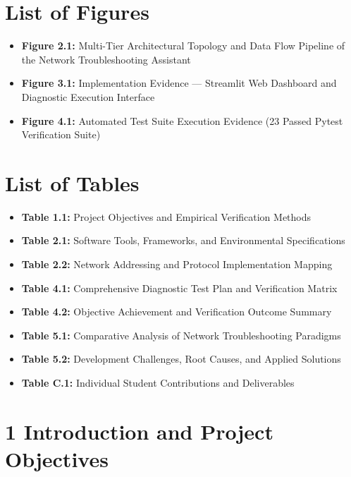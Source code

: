 \documentclass[
]{article}
\providecommand{\tightlist}{%
  \setlength{\itemsep}{0pt}\setlength{\parskip}{0pt}}
\begin{document}
\vspace{0.5cm}

\section{List of Figures}\label{list-of-figures}

\begin{itemize}
\tightlist
\item \textbf{Figure 2.1:} Multi-Tier Architectural Topology and Data Flow Pipeline of the Network Troubleshooting Assistant
\item \textbf{Figure 3.1:} Implementation Evidence --- Streamlit Web Dashboard and Diagnostic Execution Interface
\item \textbf{Figure 4.1:} Automated Test Suite Execution Evidence (23 Passed Pytest Verification Suite)
\end{itemize}

\vspace{0.5cm}

\section{List of Tables}\label{list-of-tables}

\begin{itemize}
\tightlist
\item \textbf{Table 1.1:} Project Objectives and Empirical Verification Methods
\item \textbf{Table 2.1:} Software Tools, Frameworks, and Environmental Specifications
\item \textbf{Table 2.2:} Network Addressing and Protocol Implementation Mapping
\item \textbf{Table 4.1:} Comprehensive Diagnostic Test Plan and Verification Matrix
\item \textbf{Table 4.2:} Objective Achievement and Verification Outcome Summary
\item \textbf{Table 5.1:} Comparative Analysis of Network Troubleshooting Paradigms
\item \textbf{Table 5.2:} Development Challenges, Root Causes, and Applied Solutions
\item \textbf{Table C.1:} Individual Student Contributions and Deliverables
\end{itemize}

\newpage

\section{1 Introduction and Project Objectives}\label{introduction-and-project-objectives}
\end{document}
